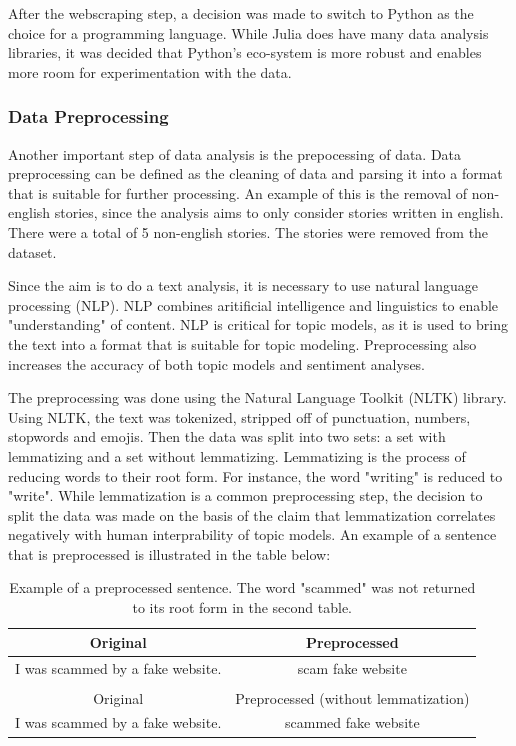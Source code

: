After the webscraping step, a decision was made to switch to Python as the choice for a programming language. While Julia does have many data analysis libraries, it was decided that Python's eco-system is more robust and enables more room for experimentation with the data. 

\subsubsection{Data Preprocessing}

Another important step of data analysis is the prepocessing of data. Data preprocessing can be defined as the cleaning of data and parsing it into a format that is suitable for further processing. An example of this is the removal of non-english stories, since the analysis aims to only consider stories written in english. There were a total of 5 non-english stories. The stories were removed from the dataset.

Since the aim is to do a text analysis, it is necessary to use natural language processing (NLP). NLP combines aritificial intelligence and linguistics to enable "understanding" of content. NLP is critical for topic models, as it is used to bring the text into a format that is suitable for topic modeling. Preprocessing also increases the accuracy of both topic models and sentiment analyses.~\cite{haddi2013role}\cite{chauhan2021topic}

The preprocessing was done using the Natural Language Toolkit (NLTK) library. Using NLTK, the text was tokenized, stripped off of punctuation, numbers, stopwords and emojis. Then the data was split into two sets: a set with lemmatizing and a set without lemmatizing. Lemmatizing is the process of reducing words to their root form. For instance, the word "writing" is reduced to "write". While lemmatization is a common preprocessing step, the decision to split the data was made on the basis of the claim that lemmatization correlates negatively with human interprability of topic models. An example of a sentence that is preprocessed is illustrated in the table below:


\begin{table}[h]
    \centering
    \begin{tabular}{cc}
        Original & Preprocessed \\ \hline
        I was scammed by a fake website. & scam fake website \\
        \\
        Original & Preprocessed (without lemmatization) \\ \hline
        I was scammed by a fake website. & scammed fake website \\
    \end{tabular}
    \caption{Example of a preprocessed sentence. The word "scammed" was not returned to its root form in the second table.}
    \label{tab:preprocessing}
\end{table}

